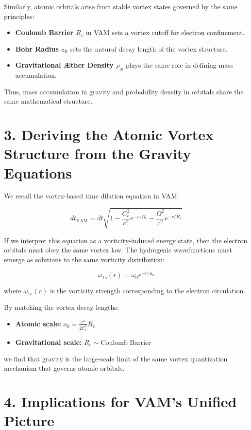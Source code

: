 \documentclass[a4paper,10pt]{article}
\begin{document}
Similarly, atomic orbitals arise from stable vortex states governed by the same principles:

\begin{itemize}
    \item \textbf{Coulomb Barrier \(R_c\)} in VAM sets a vortex cutoff for electron confinement.
    \item \textbf{Bohr Radius \(a_0\)} sets the natural decay length of the vortex structure.
    \item \textbf{Gravitational Æther Density \(\rho_\text{\ae}\)} plays the same role in defining mass accumulation.
\end{itemize}

Thus, mass accumulation in gravity and probability density in orbitals share the same mathematical structure.

\section*{3. Deriving the Atomic Vortex Structure from the Gravity Equations}

We recall the vortex-based time dilation equation in VAM:

\[
dt_\text{VAM} = dt \sqrt{1 - \frac{C_e^2}{c^2} e^{-r/R_c} - \frac{\Omega^2}{c^2} e^{-r/R_c}}
\]

If we interpret this equation as a vorticity-induced energy state, then the electron orbitals must obey the same vortex law. The hydrogenic wavefunctions must emerge as solutions to the same vorticity distribution:

\[
\omega_{1s}(r) = \omega_0 e^{-r/a_0}
\]

where \(\omega_{1s}(r)\) is the vorticity strength corresponding to the electron circulation.

By matching the vortex decay lengths:

\begin{itemize}
    \item \textbf{Atomic scale:} \(a_0 = \frac{c^2}{2C_e^2} R_c\)
    \item \textbf{Gravitational scale:} \(R_c \sim \text{Coulomb Barrier}\)
\end{itemize}

we find that gravity is the large-scale limit of the same vortex quantization mechanism that governs atomic orbitals.

\section*{4. Implications for VAM's Unified Picture}
\end{document}
